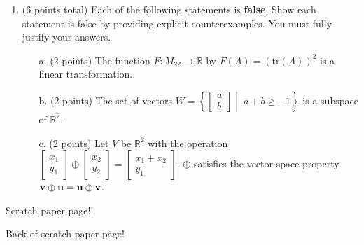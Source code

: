 \documentclass[12pt]{extarticle}
\begin{document}
\begin{enumerate}
\newpage




   

    







\newpage

\item (6 points total)  Each of the following statements is \textbf{false}. Show each statement is false by providing explicit counterexamples. You must fully justify your answers.

\begin{itemize}
\item[a.] (2 points) The function $F:M_{22}\to \mathbb{R}$ by $F(A)=(\text{tr}(A))^2$ is a linear transformation. 
\vfill

\item[b.] (2 points) The set of vectors $W=\left\{\begin{bmatrix} a\\ b\end{bmatrix}\middle|\; a+b\geq -1\right\}$ is  a subspace of $\mathbb{R}^2$.

\vfill

\item[c.] (2 points) Let $V$ be $\mathbb{R}^2$ with the operation $\begin{bmatrix} x_1\\ y_1\end{bmatrix}\oplus \begin{bmatrix} x_2\\ y_2\end{bmatrix} = \begin{bmatrix} x_1+x_2\\ y_1\end{bmatrix}$.  $\oplus$ satisfies the vector space property ${\mathbf{v}}\oplus {\mathbf{u}}={\mathbf{u}}\oplus {\mathbf{v}}$.

\vfill

\end{itemize}


 
 


    


\newpage



\end{enumerate}


\newpage

Scratch paper page!!

\newpage

Back of scratch paper page!
\end{document}
